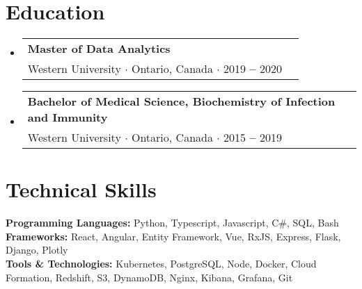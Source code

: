 \documentclass[letterpaper,10pt]{article}
\makeatletter
\newcommand{\resumeEducationHeading}[4]{
  \vspace{-2pt}\item
    \begin{tabular*}{0.97\textwidth}[t]{l@{\extracolsep{\fill}}r}
      \textbf{#1}\\
      \quad \small#3 $\cdot$ \small #4 $\cdot$ #2\\
    \end{tabular*}\vspace{-5pt}
}
\newcommand{\resumeOrganizationHeading}[4]{
  \vspace{-2pt}\item
    \begin{tabular*}{0.97\textwidth}[t]{l@{\extracolsep{\fill}}r}
      \textbf{#1} & \textit{\small #2} \\
      \textit{\small#3}
    \end{tabular*}\vspace{-7pt}
}
\newcommand{\resumeSubHeadingListStart}{\begin{itemize}[leftmargin=0.15in, label={}]}
\newcommand{\resumeSubHeadingListEnd}{\end{itemize}}
\makeatother
\begin{document}

\vspace*{1pt}
\section{Education}
  \vspace{3pt}
  \resumeSubHeadingListStart
    
    \resumeEducationHeading
      {Master of Data Analytics}{2019 \textbf{--} 2020}
      {Western University}{Ontario, Canada}

    \resumeEducationHeading
      {Bachelor of Medical Science, Biochemistry of Infection and Immunity}{2015 \textbf{--} 2019}
      {Western University}{Ontario, Canada}

    \resumeSubHeadingListEnd


\vspace*{1pt}
\section{Technical Skills}
  \vspace{3pt}
  \resumeSubHeadingListStart
    \small{\item{
        \textbf{Programming Languages:}{ Python, Typescript, Javascript, C\#, SQL, Bash } \\ \vspace{3pt}
        \textbf{Frameworks:}{ React, Angular, Entity Framework, Vue, RxJS, Express, Flask, Django, Plotly } \\ \vspace{3pt}
        \textbf{Tools \& Technologies:}{ Kubernetes, PostgreSQL, Node, Docker, Cloud Formation, Redshift, S3, DynamoDB, Nginx, Kibana, Grafana, Git } \\
    }}
  \resumeSubHeadingListEnd



    
    

\end{document}
